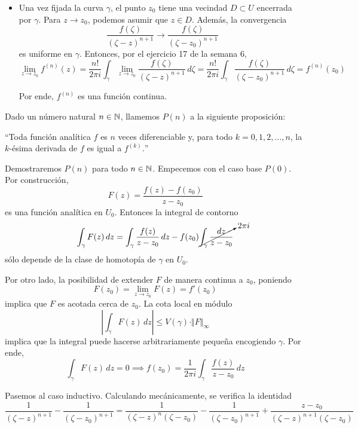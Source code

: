 \begin{solution}
\begin{enumerate}[label=(\alph*)]
\begin{itemize}
        \item Una vez fijada la curva $\gamma$, el punto $z_0$ tiene una vecindad $D \subset U$ encerrada por $\gamma$. Para $z \to z_0$, podemos asumir que $z \in D$. Además, la convergencia
        $$\frac {f(\zeta)} {(\zeta - z)^{n+1}} \to \frac {f(\zeta)} {(\zeta - z_0)^{n+1}}$$
        es uniforme en $\gamma$. Entonces, por el ejercicio 17 de la semana 6,
        $$
        \lim_{z \to z_0} f^{(n)}(z)
            = \frac {n!} {2\pi i} \int_\gamma \lim_{z \to z_0} \frac {f(\zeta)} {(\zeta - z)^{n+1}} \, d\zeta
            = \frac {n!} {2\pi i} \int_\gamma \frac {f(\zeta)} {(\zeta - z_0)^{n+1}} \, d\zeta
            = f^{(n)}(z_0)
        $$
        
        Por ende, $f^{(n)}$ es una función continua.
    \end{itemize}
    
    Dado un número natural $n \in \mathbb N$, llamemos $P(n)$ a la siguiente proposición:
    \begin{displayquote}
    ``Toda función analítica $f$ es $n$ veces diferenciable y, para todo $k = 0, 1, 2, \dots, n$, la $k$-ésima derivada de $f$ es igual a $f^{(k)}.$''
    \end{displayquote}
    
    Demostraremos $P(n)$ para todo $n \in \mathbb N$. Empecemos con el caso base $P(0)$. Por construcción,
    $$F(z) = \dfrac {f(z) - f(z_0)} {z - z_0}$$
    es una función analítica en $U_0$. Entonces la integral de contorno
    $$
    \int_\gamma F(z) \, dz
        = \int_\gamma \frac {f(z)} {z - z_0} \, dz
        - f(z_0) \cancelto {2\pi i} {\int_\gamma \frac {dz} {z - z_0}}
    $$
    sólo depende de la clase de homotopía de $\gamma$ en $U_0$.
    
    Por otro lado, la posibilidad de extender $F$ de manera continua a $z_0$, poniendo
    $$F(z_0) = \lim_{z \to z_0} F(z) = f'(z_0)$$
    implica que $F$ es acotada cerca de $z_0$. La cota local en módulo
    $$\left| \int_\gamma F(z) \, dz \right| \le V(\gamma) \cdot \Vert F \Vert_\infty$$
    implica que la integral puede hacerse arbitrariamente pequeña encogiendo $\gamma$. Por ende,
    $$\int_\gamma F(z) \, dz = 0 \implies f(z_0) = \frac 1 {2\pi i} \int_\gamma \frac {f(z)} {z - z_0} \, dz$$
    
    Pasemos al caso inductivo. Calculando mecánicamente, se verifica la identidad
    $$
    \frac 1 {(\zeta - z)^{n+1}} - \frac 1 {(\zeta - z_0)^{n+1}}
        = \frac 1 {(\zeta - z)^n (\zeta - z_0)}
        - \frac 1 {(\zeta - z_0)^{n+1}}
        + \frac {z - z_0} {(\zeta - z)^{n+1} (\zeta - z_0)}
    $$
    

\end{enumerate}
\end{solution}
